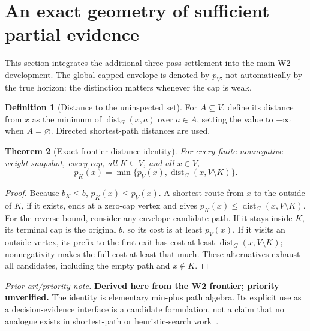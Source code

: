 \documentclass[11pt,letterpaper]{article}
\newtheorem{theorem}{Theorem}[section]
\theoremstyle{definition}
\newtheorem{definition}[theorem]{Definition}
\theoremstyle{remark}
\newcommand{\dist}{\operatorname{dist}}
\newcommand{\novel}[1]{\par\begingroup\small\textit{Prior-art/priority note.} #1\par\endgroup}
\begin{document}
\section{An exact geometry of sufficient partial evidence}
This section integrates the additional three-pass settlement into the main W2 development. The global capped envelope is denoted by \(p_V\), not automatically by the true horizon: the distinction matters whenever the cap is weak.
\begin{definition}[Distance to the uninspected set]
For \(A\subseteq V\), define its distance from \(x\) as the minimum of \(\dist_G(x,a)\) over \(a\in A\), setting the value to \(+\infty\) when \(A=\varnothing\). Directed shortest-path distances are used.
\end{definition}
\begin{theorem}[Exact frontier-distance identity]\label{thm:identity}
For every finite nonnegative-weight snapshot, every cap, all \(K\subseteq V\), and all \(x\in V\),
\begin{equation}\label{eq:identity}
\boxed{\quad p_K(x)=\min\bigl\{p_V(x),\dist_G(x,V\setminus K)\bigr\}.\quad}
\end{equation}
\end{theorem}
\begin{proof}
Because \(b_K\le b\), \(p_K(x)\le p_V(x)\). A shortest route from \(x\) to the outside of \(K\), if it exists, ends at a zero-cap vertex and gives \(p_K(x)\le\dist_G(x,V\setminus K)\). For the reverse bound, consider any envelope candidate path. If it stays inside \(K\), its terminal cap is the original \(b\), so its cost is at least \(p_V(x)\). If it visits an outside vertex, its prefix to the first exit has cost at least \(\dist_G(x,V\setminus K)\); nonnegativity makes the full cost at least that much. These alternatives exhaust all candidates, including the empty path and \(x\notin K\).
\end{proof}
\novel{\textbf{Derived here from the W2 frontier; priority unverified.} The identity is elementary min-plus path algebra. Its explicit use as a decision-evidence interface is a candidate formulation, not a claim that no analogue exists in shortest-path or heuristic-search work~\cite{Bellman,Mohri,Hart1968,Settlement}.}
\end{document}
